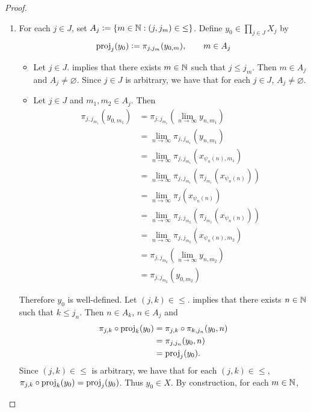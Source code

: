 \documentclass{book}
\begin{document}
\begin{proof}
\begin{enumerate}
\begin{enumerate}
				\item For each $j \in J$, set $A_j \vcentcolon= \{m \in \mathbb{N}: (j, j_m) \in {\leq}\}$. Define $y_0 \in \prod\limits_{j \in J} X_j$ by 
				$$\operatorname{\text{proj}}_j(y_0) \vcentcolon= \pi_{j,j_m}(y_{0, m}), \quad \quad m \in A_j$$ 
				\begin{itemize} 
					\item Let $j \in J$.  implies that there exists $m \in \mathbb{N}$ such that $j \leq j_m$. Then $m \in A_j$ and $A_j \neq \varnothing$. Since $j \in J$ is arbitrary, we have that for each $j \in J$, $A_j \neq \varnothing$.
					\item  Let $j \in J$ and $m_1, m_2 \in A_j$. Then 
					\begin{align*}
						\pi_{j,j_{m_1}}(y_{0,m_1})
						& = \pi_{j, j_{m_1}}(\lim\limits_{n \rightarrow \infty} y_{n,m_1}) \\
						& = \lim\limits_{n \rightarrow \infty} \pi_{j, j_{m_1}}( y_{n,m_1}) \\
						& = \lim\limits_{n \rightarrow \infty} \pi_{j, j_{m_1}}(x_{\psi_n(n),m_1}) \\
						& = \lim\limits_{n \rightarrow \infty} \pi_{j, j_{m_1}}(\pi_{j_{m_1}}(x_{\psi_n(n)})) \\
						& = \lim\limits_{n \rightarrow \infty} \pi_j(x_{\psi_n(n)}) \\
						& = \lim\limits_{n \rightarrow \infty} \pi_{j, j_{m_2}}(\pi_{j_{m_2}}(x_{\psi_n(n)})) \\
						& = \lim\limits_{n \rightarrow \infty} \pi_{j, j_{m_2}}(x_{\psi_n(n),m_2}) \\
						& = \pi_{j, j_{m_2}}(\lim\limits_{n \rightarrow \infty} y_{n,m_2}) \\
						& = \pi_{j,j_{m_2}}(y_{0,m_2})
					\end{align*}
				\end{itemize}
				Therefore $y_0$ is well-defined. Let $(j,k) \in {\leq}$.  implies that there exists $n \in \mathbb{N}$ such that $k \leq j_n$. Then $n \in A_k$, $n \in A_j$ and 
				\begin{align*}
					\pi_{j,k} \circ \operatorname{\text{proj}}_k(y_0)
					& = \pi_{j,k} \circ  \pi_{k, j_n}(y_0,n) \\
					& = \pi_{j, j_n}(y_0, n) \\
					& = \operatorname{\text{proj}}_j(y_0).
				\end{align*}
				Since $(j,k) \in {\leq}$ is arbitrary, we have that for each $(j,k) \in {\leq}$, $\pi_{j,k} \circ \operatorname{\text{proj}}_k(y_0) = \operatorname{\text{proj}}_j(y_0)$. Thus $y_0 \in X$. By construction, for each $m \in \mathbb{N}$, 

\end{enumerate}
\end{enumerate}
\end{proof}
\end{document}
